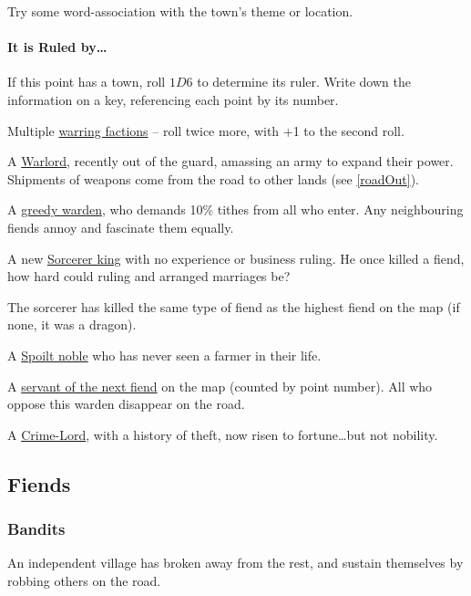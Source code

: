 \begin{multicols}{2}
Try some word-association with the town's theme or location.

\paragraph{It is Ruled by\ldots{}}

If this point has a town, roll $1D6$ to determine its ruler.
Write down the information on a key, referencing each point by its number.

\begin{dlist}
  \item
  Multiple \underline{warring factions} -- roll twice more, with +1 to the second roll.
  \item
  A \underline{Warlord}, recently out of the \gls{guard}, amassing an army to expand their power.
  Shipments of weapons come from the road to other lands
  (see \vref{roadOut}).
  \item
  A \underline{greedy \gls{warden}}, who demands 10\% tithes from all who enter.
  Any neighbouring fiends annoy and fascinate them equally.
  \item
  A new \underline{Sorcerer king} with no experience or business ruling.
  He once killed a fiend, how hard could ruling  and arranged marriages be?

  The sorcerer has killed the same type of fiend as the highest fiend on the map (if none, it was a dragon).
  \item
  A \underline{Spoilt noble} who has never seen a farmer in their life.
  \item
  A \underline{servant of the next fiend} on the map (counted by point number).
  All who oppose this \gls{warden} disappear on the road.
  \item
  A \underline{Crime-Lord}, with a history of theft, now risen to fortune\ldots but not nobility.
\end{dlist}

\subsection{Fiends}

\subsubsection{Bandits}
\label{banditsPoint}

An independent \gls{village} has broken away from the rest, and sustain themselves by robbing others on the road.


\end{multicols}

